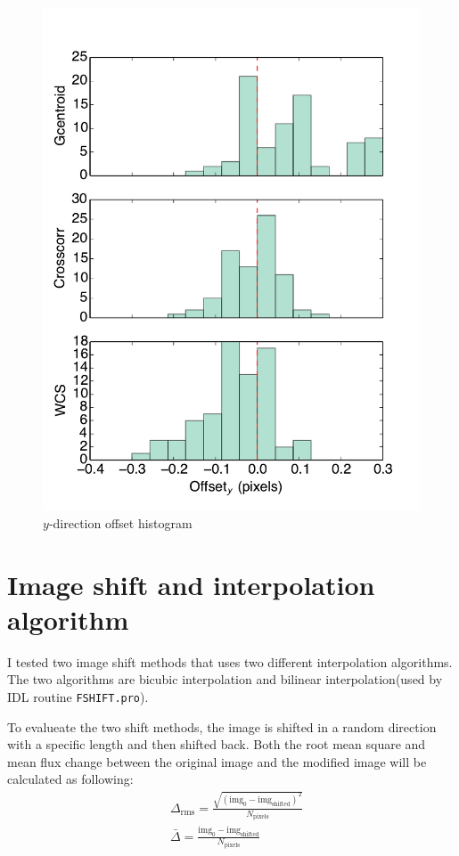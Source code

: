 \documentclass[paper=letter, fontsize=11pt]{scrartcl} %
\numberwithin{equation}{section} %
\numberwithin{figure}{section} %
\numberwithin{table}{section} %
\begin{document}
\begin{figure}
  \centering
  \includegraphics[width=\textwidth]{y_off}
  \caption{$y$-direction offset histogram}
  \label{fig:y_off}
\end{figure}

\section{Image shift and interpolation algorithm}

I tested two image shift methods that uses two different interpolation
algorithms. The two algorithms are bicubic interpolation and bilinear
interpolation(used by  IDL routine \texttt{FSHIFT.pro}).\par

To evalueate the two shift methods, the image is shifted in a random direction
with a specific length and then shifted back. Both the root mean
square and mean flux change between the original image and the
modified image  will be calculated as following:
\begin{align}
  &\Delta_{\mathrm{rms}} = \frac{\sqrt{(\mathrm{img}_{0} -
      \mathrm{img_{shifted}})^{2}}}{N_{\mathrm{pixels}}}\\
  &\bar{\Delta} = \frac{\mathrm{img}_{0} - \mathrm{img_{shifted}}}{N_{\mathrm{pixels}}}
\end{align}
\end{document}
